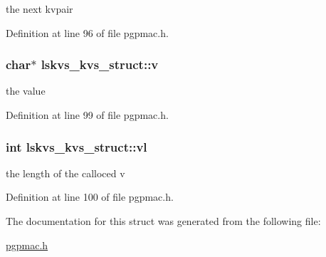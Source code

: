 the next kvpair 



Definition at line 96 of file pgpmac.\-h.

\hypertarget{structlskvs__kvs__struct_a27a0ae4415b6d65c8a9f9fac11c130f9}{
\subsubsection[{v}]{\setlength{\rightskip}{0pt plus 5cm}char$\ast$ lskvs\-\_\-kvs\-\_\-struct\-::v}}\label{structlskvs__kvs__struct_a27a0ae4415b6d65c8a9f9fac11c130f9}


the value 



Definition at line 99 of file pgpmac.\-h.

\hypertarget{structlskvs__kvs__struct_aa1c980ae62cdf78d8b358b3a51deda6a}{
\subsubsection[{vl}]{\setlength{\rightskip}{0pt plus 5cm}int lskvs\-\_\-kvs\-\_\-struct\-::vl}}\label{structlskvs__kvs__struct_aa1c980ae62cdf78d8b358b3a51deda6a}


the length of the calloced v 



Definition at line 100 of file pgpmac.\-h.



The documentation for this struct was generated from the following file\-:\begin{DoxyCompactItemize}
\item 
\hyperlink{pgpmac_8h}{pgpmac.\-h}\end{DoxyCompactItemize}
